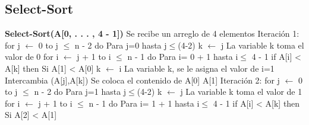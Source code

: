 \documentclass[12pt,twoside]{article}
\begin{document}
\subsection{Select-Sort}
\textbf{Select-Sort(A[0, . . . , 4 - 1])} \hspace*{1cm}Se recibe un
arreglo de 4 elementos \newline
Iteración 1:\newline
for j $\longleftarrow$ 0 to j $\leq$ n - 2 do \hspace*{1cm}Para j=0
hasta j$\leq$(4-2) \newline
\hspace*{1cm}k $\longleftarrow$ j \hspace*{1cm}La variable k toma el
valor de 0 \newline
\hspace*{1cm}for i $\longleftarrow$ j + 1 to i $\leq$ n - 1 do
\hspace*{1cm}Para i= 0 + 1 hasta i$\leq$ 4 - 1 \newline
\hspace*{1.5cm}if A[i] < A[k] then \hspace*{1cm}Si A[1] < A[0]
\newline
\hspace*{2cm}k $\longleftarrow$ i \hspace*{1cm}La variable k, se le
asigna el valor de i=1 \newline
\hspace*{1.5cm}Intercambia (A[j],A[k]) \hspace*{1cm}Se coloca el
contenido de A[0] A[1]\newline \newline
Iteración 2:\newline
for j $\longleftarrow$ 0 to j $\leq$ n - 2 do \hspace*{1cm}Para j=1
hasta j$\leq$(4-2) \newline
\hspace*{1cm}k $\longleftarrow$ j \hspace*{1cm}La variable k toma el
valor de 1 \newline
\hspace*{1cm}for i $\longleftarrow$ j + 1 to i $\leq$ n - 1 do
\hspace*{1cm}Para i= 1 + 1 hasta i$\leq$ 4 - 1 \newline
\hspace*{1.5cm}if A[i] < A[k] then \hspace*{1cm}Si A[2] < A[1]
\newline
\end{document}
